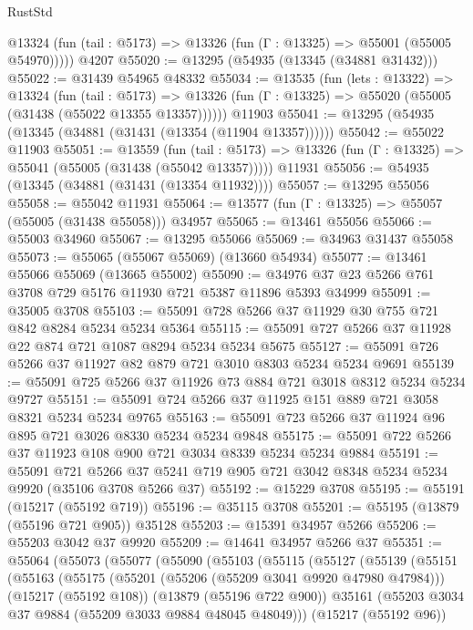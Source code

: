 \begin{lexlean}{RustStd}
\begin{coremodule}
      @13324 (fun (tail : @5173) => @13326 (fun (Γ : @13325) => @55001 (@55005 @54970)))))
    @4207
@55020 := @13295 (@54935 (@13345 (@34881 @31432)))
@55022 := @31439 @54965 @48332
@55034 := @13535
    (fun (lets : @13322) =>
    @13324
      (fun (tail : @5173) =>
      @13326 (fun (Γ : @13325) => @55020 (@55005 (@31438 (@55022 @13355 @13357))))))
    @11903
@55041 := @13295 (@54935 (@13345 (@34881 (@31431 (@13354 (@11904 @13357))))))
@55042 := @55022 @11903
@55051 := @13559
    (fun (tail : @5173) => @13326 (fun (Γ : @13325) => @55041 (@55005 (@31438 (@55042 @13357)))))
    @11931
@55056 := @54935 (@13345 (@34881 (@31431 (@13354 @11932))))
@55057 := @13295 @55056
@55058 := @55042 @11931
@55064 := @13577 (fun (Γ : @13325) => @55057 (@55005 (@31438 @55058))) @34957
@55065 := @13461 @55056
@55066 := @55003 @34960
@55067 := @13295 @55066
@55069 := @34963 @31437 @55058
@55073 := @55065 (@55067 @55069) (@13660 @54934)
@55077 := @13461 @55066 @55069 (@13665 @55002)
@55090 := @34976 @37 @23 @5266 @761 @3708 @729 @5176 @11930 @721 @5387 @11896 @5393 @34999
@55091 := @35005 @3708
@55103 := @55091 @728 @5266 @37 @11929 @30 @755 @721 @842 @8284 @5234 @5234 @5364
@55115 := @55091 @727 @5266 @37 @11928 @22 @874 @721 @1087 @8294 @5234 @5234 @5675
@55127 := @55091 @726 @5266 @37 @11927 @82 @879 @721 @3010 @8303 @5234 @5234 @9691
@55139 := @55091 @725 @5266 @37 @11926 @73 @884 @721 @3018 @8312 @5234 @5234 @9727
@55151 := @55091 @724 @5266 @37 @11925 @151 @889 @721 @3058 @8321 @5234 @5234 @9765
@55163 := @55091 @723 @5266 @37 @11924 @96 @895 @721 @3026 @8330 @5234 @5234 @9848
@55175 := @55091 @722 @5266 @37 @11923 @108 @900 @721 @3034 @8339 @5234 @5234 @9884
@55191 := @55091
    @721
    @5266
    @37
    @5241
    @719
    @905
    @721
    @3042
    @8348
    @5234
    @5234
    @9920
    (@35106 @3708 @5266 @37)
@55192 := @15229 @3708
@55195 := @55191 (@15217 (@55192 @719))
@55196 := @35115 @3708
@55201 := @55195 (@13879 (@55196 @721 @905)) @35128
@55203 := @15391 @34957 @5266
@55206 := @55203 @3042 @37 @9920
@55209 := @14641 @34957 @5266 @37
@55351 := @55064
    (@55073
      (@55077
        (@55090
          (@55103
            (@55115
              (@55127
                (@55139
                  (@55151
                    (@55163
                      (@55175
                        (@55201 (@55206 (@55209 @3041 @9920 @47980 @47984)))
                        (@15217 (@55192 @108))
                        (@13879 (@55196 @722 @900))
                        @35161
                        (@55203 @3034 @37 @9884 (@55209 @3033 @9884 @48045 @48049)))
                      (@15217 (@55192 @96))

\end{coremodule}
\end{lexlean}
